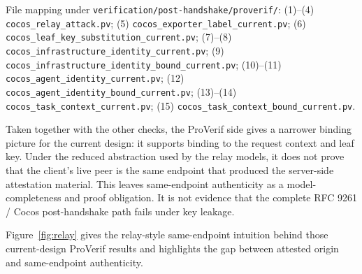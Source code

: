 \documentclass[11pt,a4paper]{article}
\begin{document}
{\footnotesize\raggedright File mapping under
\texttt{verification/post-handshake/proverif/}: (1)--(4)
\texttt{cocos\_relay\_attack.pv}; (5)
\texttt{cocos\_exporter\_label\_current.pv}; (6)
\texttt{cocos\_leaf\_key\_substitution\_current.pv}; (7)--(8)
\texttt{cocos\_infrastructure\_identity\_current.pv}; (9)
\texttt{cocos\_infrastructure\_identity\_bound\_current.pv}; (10)--(11)
\texttt{cocos\_agent\_identity\_current.pv}; (12)
\texttt{cocos\_agent\_identity\_bound\_current.pv}; (13)--(14)
\texttt{cocos\_task\_context\_current.pv}; (15)
\texttt{cocos\_task\_context\_bound\_current.pv}.\par}

Taken together with the other checks, the ProVerif side gives a narrower
binding picture for the current design: it supports binding to the request
context and leaf key. Under the reduced abstraction used by the relay models,
it does not prove that the client's live peer is the same endpoint that
produced the server-side attestation material. This leaves same-endpoint
authenticity as a model-completeness and proof obligation. It is not evidence
that the complete RFC 9261 / Cocos post-handshake path fails under key leakage.

Figure~\ref{fig:relay} gives the relay-style same-endpoint intuition behind those
current-design ProVerif results and highlights the gap between attested origin
and same-endpoint authenticity.
\end{document}
